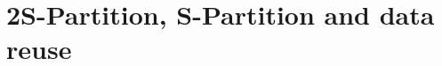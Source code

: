 \documentclass[sigconf]{acmart}
\newcommand\todo[1]{\textcolor{red}{#1}}
\begin{document}
%
%
%
%
%
	\section{2S-Partition, S-Partition and data reuse}
\label{sec:datareuse}
\end{document}

